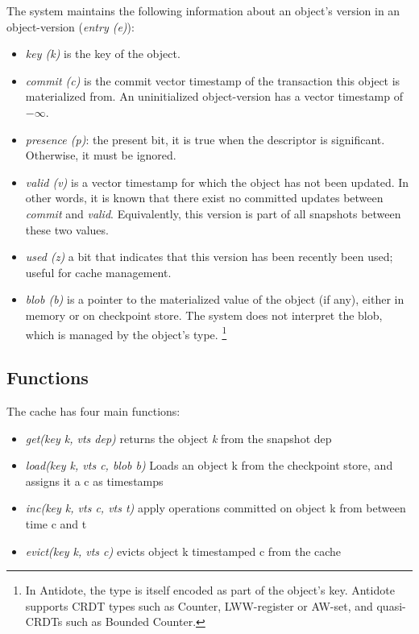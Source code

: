 \documentclass[twoside]{article}
\begin{document}
The system maintains the following information about an object's version
in an object-version (\emph{entry (e)}):
\begin{itemize}
\item
  \emph{key (k)} is the key of the object.
\item
  \emph{commit (c)} is the commit vector timestamp of the transaction
  this object is materialized from.
  An uninitialized object-version has a vector timestamp of $-\infty$.
\item
\emph{presence (p)}: the present bit, it is true when the descriptor is
significant. 
Otherwise, it must be ignored.
\item
  \emph{valid (v)} is a vector timestamp for which the object has
  not been updated.
  In other words, it is known that there exist no committed
  updates between \emph{commit} and \emph{valid}.
  Equivalently, this version is part of all snapshots between these two
  values.
\item
  \emph{used (z)} a bit that indicates that this version has been recently been
  used; useful for cache management.
\item
  \emph{blob (b)} is a pointer to the materialized value of the object (if
  any), either in memory or on checkpoint store.
  The system does not interpret the blob, which is managed by the
  object's type.%
  \footnote{
    In Antidote, the type is itself encoded as part of the object's key.
    Antidote supports CRDT types such as Counter, LWW-register or
    AW-set, and quasi-CRDTs such as Bounded Counter.
  }
\end{itemize}


\subsection{Functions}
The cache has four main functions:
\begin{itemize}
  \item \emph{get(key k, vts dep)} returns the object \emph{k} from the snapshot dep
  \item \emph{load(key k, vts c, blob b)} Loads an object k from the checkpoint
  store, and assigns it a c as timestamps 
  \item \emph{inc(key k, vts c, vts t)} apply operations committed on object k from
  between time c and t 
  \item \emph{evict(key k, vts c)} evicts object k timestamped c from the cache

\end{itemize}
\end{document}
